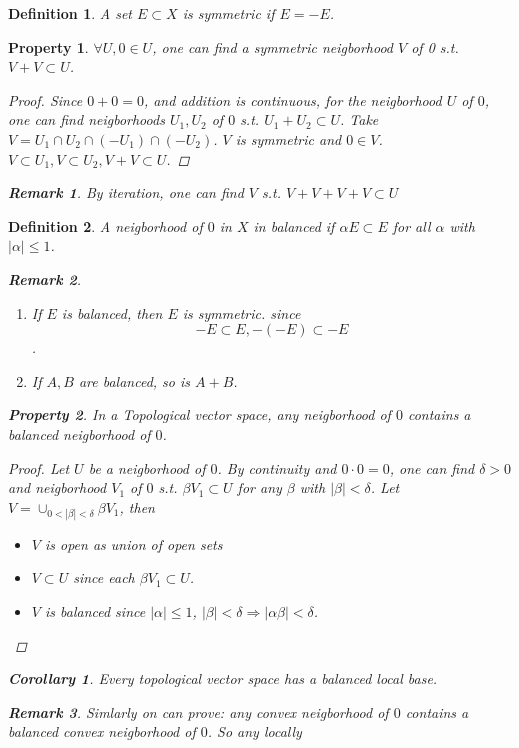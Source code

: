 \documentclass{article}
\newtheorem*{property}{Property}
\newtheorem*{definition}{Definition}
\newtheorem*{remark}{Remark}
\newtheorem*{corollary}{Corollary}
\begin{document}
\begin{definition}
  A set $E \subset X$ is symmetric if $E = -E$.
\end{definition}
\begin{property}
  $\forall U, 0 \in U$, one can find a symmetric neigborhood $V$ of 0 s.t.
  $V + V \subset U$.
  \begin{proof}
    Since $0 + 0 = 0$, and addition is continuous, 
    for the neigborhood $U$ of $0$, one can find neigborhoods $U_1, U_2$
    of $0$ s.t. $U_1 + U_2 \subset U$. 
    Take $V = U_1 \cap U_2 \cap (-U_1) \cap (-U_2)$. 
    $V$ is symmetric and $0 \in V$. 
    $V \subset U_1, V \subset U_2, V + V \subset U$.
  \end{proof}
  \begin{remark}
    By iteration, one can find $V$ s.t. 
    $V + V + V + V \subset U$
  \end{remark}
\end{property}
\begin{definition}
  A neigborhood of $0$ in $X$ in balanced if $\alpha E \subset E$ for all $\alpha$ with $|\alpha| \le 1$.
  \begin{remark} \hfill
    \begin{enumerate}
      \item If $E$ is balanced, then $E$ is symmetric. since 
      \[-E \subset E, -(-E) \subset -E\].
      \item If $A, B$ are balanced, so is $A + B$.
    \end{enumerate}
  \end{remark}
  \begin{property}
    In a Topological vector space, any neigborhood of $0$ contains a balanced neigborhood of $0$.
    \begin{proof}
      Let $U$ be a neigborhood of $0$. By continuity and $0 \cdot 0 = 0$, 
      one can find $\delta > 0$ and neigborhood $V_1$ of $0$ 
      s.t. $\beta V_1 \subset U$ for any $\beta$ with $|\beta| < \delta$.
      Let $V = \cup_{0 < |\beta| < \delta}\beta V_1$, then 
      \begin{itemize}
        \item $V$ is open as union of open sets
        \item $V \subset U$ since each $\beta V_1 \subset U$.
        \item $V$ is balanced since $|\alpha| \le 1$, 
              $|\beta| < \delta \Rightarrow |\alpha \beta| < \delta$.
      \end{itemize}
    \end{proof}
  \end{property}
  \begin{corollary}
    Every topological vector space has a balanced local base.
    \begin{remark}
      Simlarly on can prove: any convex neigborhood of $0$ contains a balanced convex neigborhood of $0$.
      So any locally
    \end{remark}
  \end{corollary}
\end{definition}
\end{document}
